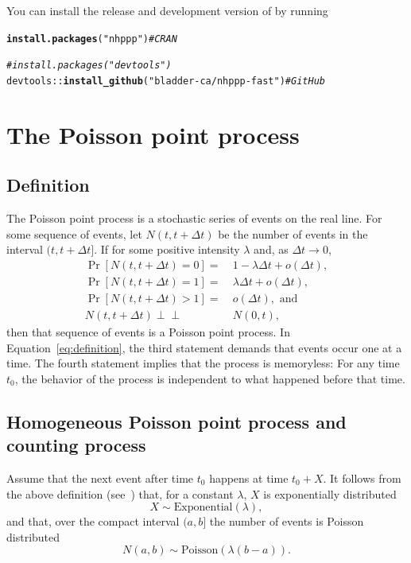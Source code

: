 \documentclass[article,nojss]{jss}\usepackage[]{graphicx}\usepackage[]{xcolor}
\makeatletter
\newcommand{\hlstr}[1]{\textcolor[rgb]{0.192,0.494,0.8}{#1}}%
\newcommand{\hlcom}[1]{\textcolor[rgb]{0.678,0.584,0.686}{\textit{#1}}}%
\newcommand{\hlopt}[1]{\textcolor[rgb]{0,0,0}{#1}}%
\newcommand{\hlstd}[1]{\textcolor[rgb]{0.345,0.345,0.345}{#1}}%
\newcommand{\hlkwd}[1]{\textcolor[rgb]{0.737,0.353,0.396}{\textbf{#1}}}%
\newenvironment{kframe}{%
 \def\at@end@of@kframe{}%
 \ifinner\ifhmode%
  \def\at@end@of@kframe{\end{minipage}}%
  \begin{minipage}{\columnwidth}%
 \fi\fi%
 \def\FrameCommand##1{\hskip\@totalleftmargin \hskip-\fboxsep
 \colorbox{shadecolor}{##1}\hskip-\fboxsep
     \hskip-\linewidth \hskip-\@totalleftmargin \hskip\columnwidth}%
 \MakeFramed {\advance\hsize-\width
   \@totalleftmargin\z@ \linewidth\hsize
   \@setminipage}}%
 {\par\unskip\endMakeFramed%
 \at@end@of@kframe}
\newenvironment{knitrout}{}{} %
\newcommand{\indep}{\perp \!\!\! \perp}
\makeatother
\begin{document}
You can install the release and development version of  by running
\begin{knitrout}
\color{fgcolor}\begin{kframe}
\begin{alltt}
\hlkwd{install.packages}\hlstd{(}\hlstr{"nhppp"}\hlstd{)} \hlcom{# CRAN}

\hlcom{# install.packages("devtools")}
\hlstd{devtools}\hlopt{::}\hlkwd{install_github}\hlstd{(}\hlstr{"bladder-ca/nhppp-fast"}\hlstd{)} \hlcom{# GitHub}
\end{alltt}
\end{kframe}
\end{knitrout}

\section{The Poisson point process} \label{sec:review}
\subsection{Definition}
The Poisson point process is a stochastic series of events on the real line. For some sequence of events, let $N(t, t + \Delta t)$ be the number of events in the interval $(t, t  + \Delta t]$. If for some positive intensity $\lambda$ and, as ${\Delta t \rightarrow 0}$,
\begin{equation}\label{eq:definition}
    \begin{aligned}
    \Pr[N(t, t + \Delta t) = 0] =&\  1 - \lambda \Delta t +  o(\Delta t), \\
    \Pr[N(t, t + \Delta t) = 1] =&\  \lambda \Delta t +  o(\Delta t), \\
    \Pr[N(t, t + \Delta t) >1] =&\  o(\Delta t),\text{ and } \\
    N(t, t + \Delta t) \indep&\ N(0, t),
    \end{aligned}
\end{equation}
then that sequence of events is a Poisson point process. In Equation~\eqref{eq:definition}, the third statement demands that events occur one at a time. The fourth statement implies that the process is memoryless: For any time $t_0$, the behavior of the process is independent to what happened before that time.

\subsection{Homogeneous Poisson point process and counting process}\label{sec:ppp-intro}
Assume that the next event after time $t_0$ happens at time $t_0 + X$. It follows from the above definition (see~\citet[par. 4.1]{cox1965theory}) that, for a constant $\lambda$, $X$ is exponentially distributed
\begin{equation}\label{eq:X_PPP}
X \sim \text{Exponential}(\lambda),
\end{equation}
and that, over the compact interval $(a, b]$ the number of events is Poisson distributed
\begin{equation}\label{eq:N_PPP}
N(a, b) \sim \text{Poisson}(\lambda (b-a)).
\end{equation}
\end{document}
